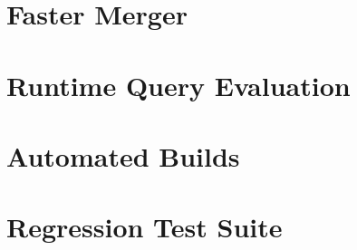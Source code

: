 \section{Faster Merger}\label{sec:merger-internals}

\section{Runtime Query Evaluation}\label{sec:runtime-query}

\section{Automated Builds}\label{sec:automated-builds}

\section{Regression Test Suite}\label{sec:regression-suite}

